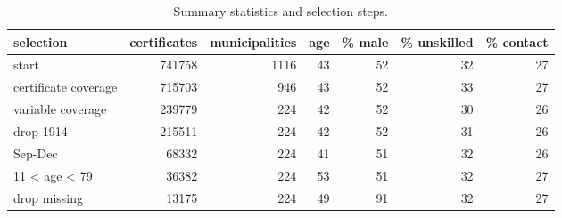 \begin{table}

\caption{\label{tab:tab:sumselect}Summary statistics and selection steps.}
\centering
\begin{tabular}[t]{l|r|r|r|r|r|r}
\hline
selection & certificates & municipalities & age & \% male & \% unskilled & \% contact\\
\hline
start & 741758 & 1116 & 43 & 52 & 32 & 27\\
\hline
certificate coverage & 715703 & 946 & 43 & 52 & 33 & 27\\
\hline
variable coverage & 239779 & 224 & 42 & 52 & 30 & 26\\
\hline
drop 1914 & 215511 & 224 & 42 & 52 & 31 & 26\\
\hline
Sep-Dec & 68332 & 224 & 41 & 51 & 32 & 26\\
\hline
11 < age < 79 & 36382 & 224 & 53 & 51 & 32 & 27\\
\hline
drop missing & 13175 & 224 & 49 & 91 & 32 & 27\\
\hline
\end{tabular}
\end{table}
